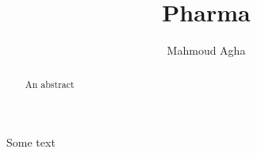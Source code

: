 \documentclass[10pt, a4paper]{report}
\author{Mahmoud Agha}
\title{Pharma}
\begin{document}
\maketitle
\tableofcontents
	\begin{abstract}
		An abstract
	\end{abstract}
Some text\cite{hatzichristou2004efficacy}












 
\end{document}
